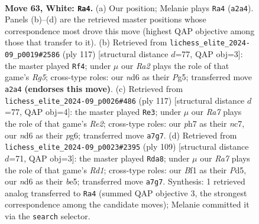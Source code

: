 \documentclass[11pt]{article}
\begin{document}
\clearpage

\begin{figure}[p]\centering
\begin{subfigure}{0.46\textwidth}\centering
\resizebox{\linewidth}{!}{%
\newchessgame
\chessboard[
  setfen={3k3r/R6p/P2n4/2r5/8/1Pp3KP/R1P3P1/5B2 w - - 3 63},
  showmover=false,
  pgfstyle=straightmove, color=movearrow, markmove={a2-a4}
]}
\caption{}
\end{subfigure}\hfill
\begin{subfigure}{0.46\textwidth}\centering
\resizebox{\linewidth}{!}{%
\newchessgame
\chessboard[
  setfen={8/2K5/1p3p2/1kp3p1/p5r1/P7/1P2R3/8 b - - 1 59},
  showmover=false,
  pgfstyle=straightmove, color=movearrow, markmove={g4-f4}
]}
\caption{}
\end{subfigure}
\\[4pt]
\begin{subfigure}{0.46\textwidth}\centering
\resizebox{\linewidth}{!}{%
\newchessgame
\chessboard[
  setfen={5bk1/1pN1r1p1/1p4Pp/8/5P2/P5P1/2R3K1/8 b - - 2 59},
  showmover=false,
  pgfstyle=straightmove, color=movearrow, markmove={e7-e3}
]}
\caption{}
\end{subfigure}\hfill
\begin{subfigure}{0.46\textwidth}\centering
\resizebox{\linewidth}{!}{%
\newchessgame
\chessboard[
  setfen={3r4/r4p2/1RK1p1kp/3pB2p/3P4/6P1/5P2/8 b - - 7 55},
  showmover=false,
  pgfstyle=straightmove, color=movearrow, markmove={d8-a8}
]}
\caption{}
\end{subfigure}
\caption{\textbf{Move 63, White: \texttt{Ra4}.} (a) Our position; Melanie plays \texttt{Ra4} (\texttt{a2a4}). Panels (b)--(d) are the retrieved master positions whose correspondence most drove this move (highest QAP objective among those that transfer to it). (b) Retrieved from \texttt{lichess\_elite\_2024-09\_p0019\#2586} (ply 117) [structural distance $d$=77, QAP obj=3]: the master played \texttt{Rf4}; under $\mu$ our \emph{Ra2} plays the role of that game's \emph{Rg5}; cross-type roles: our \emph{n}d6 as their \emph{P}g5; transferred move \texttt{a2a4} \textbf{(endorses this move)}. (c) Retrieved from \texttt{lichess\_elite\_2024-09\_p0026\#486} (ply 117) [structural distance $d$=77, QAP obj=4]: the master played \texttt{Re3}; under $\mu$ our \emph{Ra7} plays the role of that game's \emph{Re2}; cross-type roles: our \emph{p}h7 as their \emph{n}c7, our \emph{n}d6 as their \emph{p}g6; transferred move \texttt{a7g7}. (d) Retrieved from \texttt{lichess\_elite\_2024-09\_p0023\#2395} (ply 109) [structural distance $d$=71, QAP obj=3]: the master played \texttt{Rda8}; under $\mu$ our \emph{Ra7} plays the role of that game's \emph{Rd1}; cross-type roles: our \emph{B}f1 as their \emph{P}d5, our \emph{n}d6 as their \emph{b}e5; transferred move \texttt{a7g7}. Synthesis: 1 retrieved analog transferred to \texttt{Ra4} (summed QAP objective 3, the strongest correspondence among the candidate moves); Melanie committed it via the \texttt{search} selector.}
\label{fig:thought-m124}
\end{figure}
\end{document}
